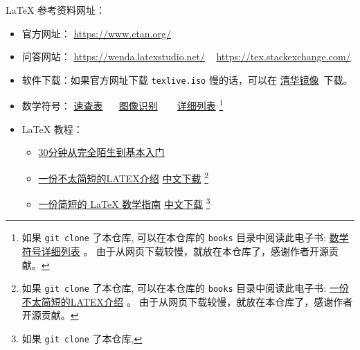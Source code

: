 \documentclass[
    11pt,
    cite=authoryear,
    device=normal,
    lang=cn,
    mode=simple,
    result=answer,
    toc=onecol,
]{elegantbook_sierxue}
\begin{document}
\LaTeX{} 参考资料网址：
\begin{itemize}
    \item 官方网址： \href{https://www.ctan.org/}{https://www.ctan.org/}
    \item 问答网站：
        \href{https://wenda.latexstudio.net/}{https://wenda.latexstudio.net/}
        ~
        \href{https://tex.stackexchange.com/}{https://tex.stackexchange.com/}
    \item 软件下载：如果官方网址下载 \lstinline{texlive.iso} 慢的话，可以在
    \href{https://mirrors.tuna.tsinghua.edu.cn/CTAN/systems/texlive/Images/}
                {清华镜像}~下载。
    \item 数学符号： \href{books/latex-math-symbols.pdf}{速查表}~ ~
        \href{http://detexify.kirelabs.org/classify.html} {图像识别} ~ ~
        \href{http://mirrors .ustc.edu.cn/CTAN/info/symbols/comprehensive/symbols-a4.pdf}
        {详细列表}
        \footnote{如果 \lstinline{git clone} 了本仓库,
        可以在本仓库的 \lstinline{books}
        目录中阅读此电子书:
        \href{books/symbols-a4.pdf}{数学符号详细列表} 。
        由于从网页下载较慢，就放在本仓库了，感谢作者开源贡献。}
    \item \LaTeX{} 教程：
        \begin{itemize}
            \item \href{https://www.latexstudio.net/archives/9377.html}
                {30分钟从完全陌生到基本入门}
            \item
                \href{https://www.ctan.org/tex-archive/info/lshort/chinese}
                {一份不太简短的LATEX介绍}
        \href{http://mirrors.ctan.org/info/lshort/chinese/lshort-zh-cn.pdf}
                {中文下载}
                \footnote{如果 \lstinline{git clone} 了本仓库,
                可以在本仓库的 \lstinline{books}
                目录中阅读此电子书:
                \href{books/lshort-zh-cn.pdf}{一份不太简短的LATEX介绍} 。
                由于从网页下载较慢，就放在本仓库了，感谢作者开源贡献。}
            \item
                \href{https://www.ctan.org/tex-archive/info/lshort/chinese}
                {一份简短的 LaTeX 数学指南}
                \href{https://wenda.latexstudio.net/article-5006.html}
                {中文下载}
                \footnote{如果 \lstinline{git clone} 了本仓库,
}
\end{itemize}
\end{itemize}
\end{document}
